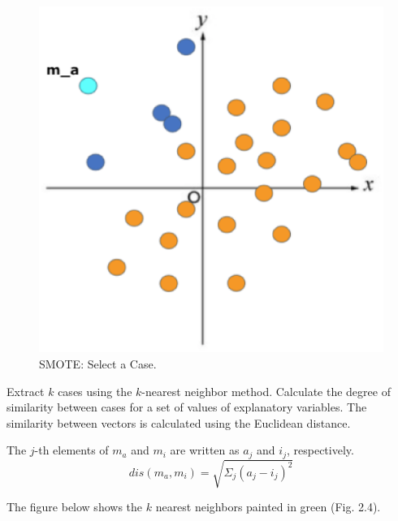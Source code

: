 \begin{center}
    \begin{figure}[ht]
        \caption{SMOTE: Select a Case.}
        \label{tab:team-rating-features}
        \begin{center}
            \includegraphics[scale=0.6]{image/smote2.eps}
        \end{center}
    \end{figure}
\end{center}

\clearpage

Extract $k$ cases using the $k$-nearest neighbor method. Calculate the degree of similarity between cases for a set of values of explanatory variables. The similarity between vectors is calculated using the Euclidean distance.

The $j$-th elements of $m_a$ and $m_i$ are written as $a_j$ and $i_j$, respectively.
$$
dis(m_a, m_i) = \sqrt{\Sigma_j(a_j - i_j)^2}
$$


The figure below shows the $k$ nearest neighbors painted in green (Fig. 2.4).

